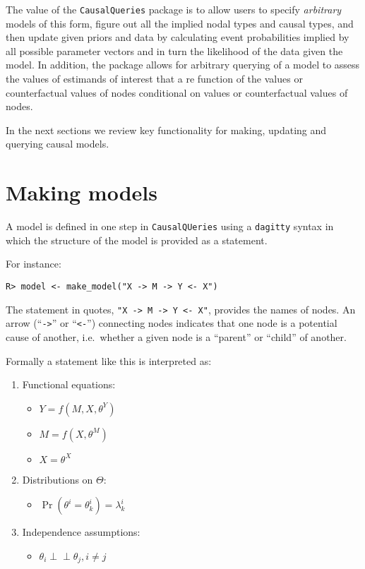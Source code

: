 \documentclass[
  11pt,
  article]{jss}
\providecommand{\tightlist}{%
  \setlength{\itemsep}{0pt}\setlength{\parskip}{0pt}}\usepackage{longtable,booktabs,array}
\begin{document}
The value of the \texttt{CausalQueries} package is to allow users to
specify \emph{arbitrary} models of this form, figure out all the implied
nodal types and causal types, and then update given priors and data by
calculating event probabilities implied by all possible parameter
vectors and in turn the likelihood of the data given the model. In
addition, the package allows for arbitrary querying of a model to assess
the values of estimands of interest that a re function of the values or
counterfactual values of nodes conditional on values or counterfactual
values of nodes.

In the next sections we review key functionality for making, updating
and querying causal models.

\hypertarget{sec-make}{%
\section{Making models}\label{sec-make}}

A model is defined in one step in \texttt{CausalQUeries} using a
\texttt{dagitty} syntax in which the structure of the model is provided
as a statement.

For instance:

\begin{verbatim}
R> model <- make_model("X -> M -> Y <- X")
\end{verbatim}

The statement in quotes,
\texttt{"X\ -\textgreater{}\ M\ -\textgreater{}\ Y\ \textless{}-\ X"},
provides the names of nodes. An arrow (``\texttt{-\textgreater{}}'' or
``\texttt{\textless{}-}'') connecting nodes indicates that one node is a
potential cause of another, i.e.~whether a given node is a ``parent'' or
``child'' of another.

Formally a statement like this is interpreted as:

\begin{enumerate}
\def\labelenumi{\arabic{enumi}.}
\item
  Functional equations:

  \begin{itemize}
  \tightlist
  \item
    \(Y = f(M, X, \theta^Y)\)
  \item
    \(M = f(X, \theta^M)\)
  \item
    \(X = \theta^X\)
  \end{itemize}
\item
  Distributions on \(\Theta\):

  \begin{itemize}
  \tightlist
  \item
    \(\Pr(\theta^i = \theta^i_k) = \lambda^i_k\)
  \end{itemize}
\item
  Independence assumptions:\\

  \begin{itemize}
  \tightlist
  \item
    \(\theta_i \perp\!\!\! \perp \theta_j, i\neq j\)
  \end{itemize}
\end{enumerate}
\end{document}
